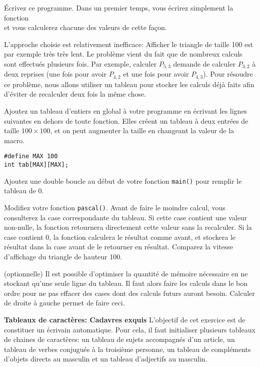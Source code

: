 \documentclass[10pt]{article}\usepackage[enonce]{exemptty}
\begin{document}
\Question Écrivez ce programme. Dans un premier temps, vous écrirez simplement
la fonction \\ et vous calculerez
chacune des valeurs de cette façon.

L'approche choisie est relativement inefficace: Afficher le triangle de taille
100 est par exemple très très lent. Le problème vient du fait que de nombreux
calculs sont effectués plusieurs fois. Par exemple, calculer $P_{5,3}$ demande
de calculer $P_{3,2}$ à deux reprises (une fois pour avoir $P_{4,2}$ et une
fois pour avoir $P_{4,3}$). Pour résoudre ce problème, nous allons utiliser un
tableau pour stocker les calculs déjà faits afin d'éviter de recalculer deux
fois la même chose.

\Question Ajoutez un tableau d'entiers en global à votre programme en écrivant
les lignes suivantes en dehors de toute fonction. Elles créent un tableau à
deux entrées de taille $100\times100$, et on peut augmenter la taille en
changeant la valeur de la macro.

\begin{Verbatim}
#define MAX 100
int tab[MAX][MAX];
\end{Verbatim}

Ajoutez une double boucle au début de votre fonction \texttt{main()} pour
remplir le tableau de 0.

\Question Modifiez votre fonction \texttt{pascal()}. Avant de faire le moindre
calcul, vous consulterez la case correspondante du tableau. Si cette case
contient une valeur non-nulle, la fonction retournera directement cette valeur
sans la recalculer. Si la case contient 0, la fonction calculera le résultat
comme avant, et stockera le résultat dans la case avant de le retourner en
résultat. Comparez la vitesse d'affichage du triangle de hauteur 100.

\Question (optionnelle) Il est possible d'optimiser la quantité de mémoire
nécessaire en ne stockant qu'une seule ligne du tableau. Il faut alors faire
les calculs dans le bon ordre pour ne pas effacer des cases dont des calculs
futurs auront besoin. Calculer de droite à gauche permet de faire ceci.

\bigskip\Exercice\textbf{Tableaux de caractères: Cadavres exquis}
L'objectif de cet exercice est de constituer un écrivain automatique. Pour
cela, il faut initialiser plusieurs tableaux de chaines de caractères: un
tableau de sujets accompagnés d'un article, un tableau de verbes conjugués à la
troisième personne, un tableau de compléments d'objets directs au masculin et
un tableau d'adjectifs au masculin.
\end{document}
